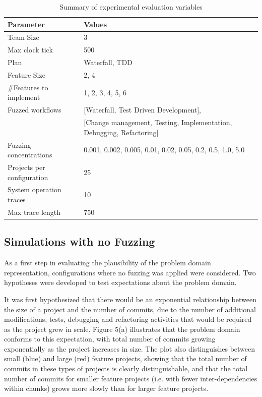 \documentclass{llncs}
\begin{document}
\begin{table}
  \centering
\begin{tabular}{|l|l|}\hline
Parameter & Values\\ \hline
Team Size & 3\\
Max clock tick & 500\\
Plan & Waterfall, TDD\\
Feature Size & 2, 4\\
\#Features to implement & 1, 2, 3, 4, 5, 6\\
Fuzzed workflows & [Waterfall, Test Driven Development],\\
& [Change management, Testing, Implementation, Debugging, Refactoring]\\
Fuzzing concentrations & 0.001, 0.002, 0.005, 0.01, 0.02, 0.05, 0.2, 0.5, 1.0, 5.0 \\
Projects per configuration & 25 \\
System operation traces & 10\\
Max trace length & 750\\ \hline
\end{tabular}

\caption{Summary of experimental evaluation variables}
\label{tab:variables}
\end{table}


\subsection{Simulations with no Fuzzing}

As a first step in evaluating the plausibility of the problem domain representation, configurations where no fuzzing was
applied were considered.  Two hypotheses were developed to test expectations about the problem domain.

It was first hypothesized that there would be an exponential relationship between the size of a project and the number
of commits, due to the number of additional modifications, tests, debugging and refactoring activities that would be
required as the project grew in scale.  Figure 5(a) illustrates that the problem domain conforms to this expectation,
with total number of commits growing exponentially as the project increases in size.  The plot also distinguishes
between small (blue) and large (red) feature projects, showing that the total number of commits in these types of
projects is clearly distinguishable, and that the total number of commits for smaller feature projects (i.e. with fewer
inter-dependencies within chunks) grows more slowly than for larger feature projects.
\end{document}
